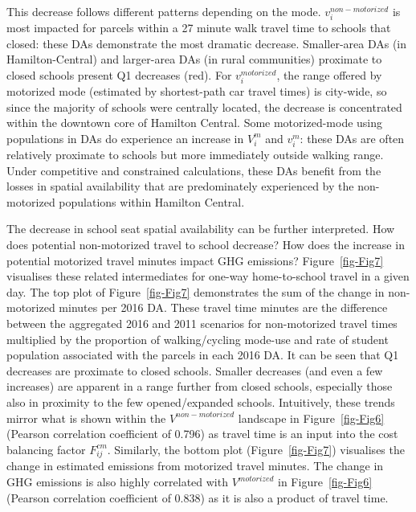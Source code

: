 \documentclass[
default
]{sn-jnl}
\begin{document}
This decrease follows different patterns depending on the mode.
\(v_i^{non-motorized}\) is most impacted for parcels within a 27 minute
walk travel time to schools that closed: these DAs demonstrate the most
dramatic decrease. Smaller-area DAs (in Hamilton-Central) and
larger-area DAs (in rural communities) proximate to closed schools
present Q1 decreases (red). For \(v_i^{motorized}\), the range offered
by motorized mode (estimated by shortest-path car travel times) is
city-wide, so since the majority of schools were centrally located, the
decrease is concentrated within the downtown core of Hamilton Central.
Some motorized-mode using populations in DAs do experience an increase
in \(V_i^m\) and \(v_i^m\): these DAs are often relatively proximate to
schools but more immediately outside walking range. Under competitive
and constrained calculations, these DAs benefit from the losses in
spatial availability that are predominately experienced by the
non-motorized populations within Hamilton Central.

The decrease in school seat spatial availability can be further
interpreted. How does potential non-motorized travel to school decrease?
How does the increase in potential motorized travel minutes impact GHG
emissions? Figure~\ref{fig-Fig7} visualises these related intermediates
for one-way home-to-school travel in a given day. The top plot of
Figure~\ref{fig-Fig7} demonstrates the sum of the change in
non-motorized minutes per 2016 DA. These travel time minutes are the
difference between the aggregated 2016 and 2011 scenarios for
non-motorized travel times multiplied by the proportion of
walking/cycling mode-use and rate of student population associated with
the parcels in each 2016 DA. It can be seen that Q1 decreases are
proximate to closed schools. Smaller decreases (and even a few
increases) are apparent in a range further from closed schools,
especially those also in proximity to the few opened/expanded schools.
Intuitively, these trends mirror what is shown within the
\(V^{non-motorized}\) landscape in Figure~\ref{fig-Fig6} (Pearson
correlation coefficient of 0.796) as travel time is an input into the
cost balancing factor \(F^{cm}_{ij}\). Similarly, the bottom plot
(Figure~\ref{fig-Fig7}) visualises the change in estimated emissions
from motorized travel minutes. The change in GHG emissions is also
highly correlated with \(V^{motorized}\) in Figure~\ref{fig-Fig6}
(Pearson correlation coefficient of 0.838) as it is also a product of
travel time.
\end{document}
